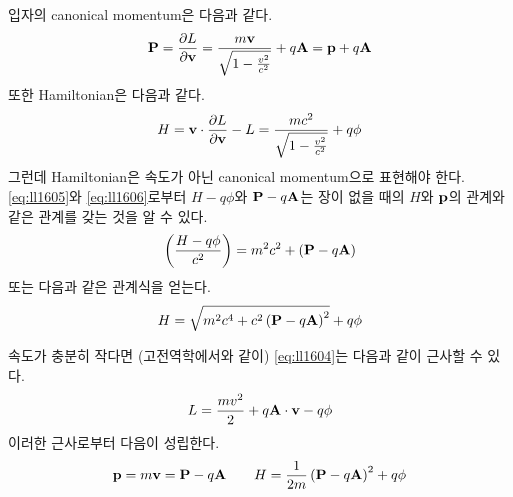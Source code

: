 입자의 canonical momentum은 다음과 같다.
\begin{equation}\label{eq:ll1605}
    \vb{P} = \pdv{L}{\vb{v}} = \frac{m \vb{v}}{\sqrt{1 - \frac{v^2}{c^2}}} + q \vb{A} = \vb{p} + q \vb{A}
\end{equation}
또한 Hamiltonian은 다음과 같다.
\begin{equation}\label{eq:ll1606}
    H = \vb{v} \cdot \pdv{L}{\vb{v}} - L = \frac{m c^2}{\sqrt{1 - \frac{v^2}{c^2}}} + q \phi
\end{equation}
그런데 Hamiltonian은 속도가 아닌 canonical momentum으로 표현해야 한다.
\eqref{eq:ll1605}와 \eqref{eq:ll1606}로부터 $H - q \phi$와 $\vb{P} - q \vb{A}$는 장이 없을 때의 $H$와 $\vb{p}$의 관계와 같은 관계를 갖는 것을 알 수 있다.
\begin{equation}
    \left( \frac{H - q \phi}{c^2} \right) = m^2 c^2 + \left( \vb{P} - q \vb{A} \right)
\end{equation}
또는 다음과 같은 관계식을 얻는다.
\begin{equation}
    H = \sqrt{m^2 c^4 + c^2 \left( \vb{P} - q \vb{A} \right)^2} + q \phi
\end{equation}

속도가 충분히 작다면 (고전역학에서와 같이) \eqref{eq:ll1604}는 다음과 같이 근사할 수 있다.
\begin{equation}
    L = \frac{m v^2}{2} + q \vb{A} \cdot \vb{v} - q \phi
\end{equation}
이러한 근사로부터 다음이 성립한다.
\begin{equation}
    \vb{p} = m \vb{v} = \vb{P} - q \vb{A}
    \qquad
    H = \frac{1}{2 m} \left( \vb{P} - q \vb{A} \right)^2 + q \phi
\end{equation}
